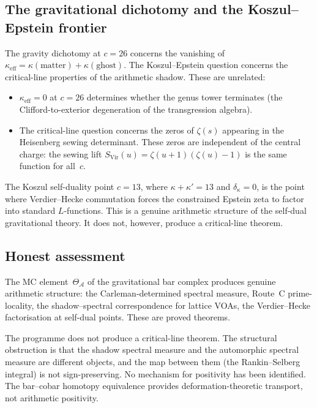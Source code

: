 \documentclass[11pt]{article}
\newcommand{\cA}{\mathcal{A}}
\begin{document}
\subsection{The gravitational dichotomy and the Koszul--Epstein frontier}

The gravity dichotomy at $c = 26$ concerns the vanishing of
$\kappa_{\mathrm{eff}} = \kappa(\mathrm{matter})
+ \kappa(\mathrm{ghost})$.  The Koszul--Epstein question
concerns the critical-line properties of the arithmetic
shadow.  These are unrelated:

\begin{itemize}
\item $\kappa_{\mathrm{eff}} = 0$ at $c = 26$ determines whether
  the genus tower terminates (the Clifford-to-exterior
  degeneration of the transgression algebra).

\item The critical-line question concerns the zeros of
  $\zeta(s)$ appearing in the Heisenberg sewing determinant.
  These zeros are independent of the central charge: the sewing
  lift $S_{\mathrm{Vir}}(u) = \zeta(u+1)(\zeta(u) - 1)$ is the
  same function for all~$c$.
\end{itemize}

The Koszul self-duality point $c = 13$, where
$\kappa + \kappa' = 13$ and $\delta_\kappa = 0$, is the point
where Verdier--Hecke commutation forces the constrained Epstein
zeta to factor into standard $L$-functions.  This is a genuine
arithmetic structure of the self-dual gravitational theory.
It does not, however, produce a critical-line theorem.

\subsection{Honest assessment}

The MC element~$\Theta_\cA$ of the gravitational bar complex
produces genuine arithmetic structure: the Carleman-determined
spectral measure, Route~C prime-locality, the shadow--spectral
correspondence for lattice VOAs, the Verdier--Hecke factorisation
at self-dual points.  These are proved theorems.

The programme does not produce a critical-line theorem.  The
structural obstruction is that the shadow spectral measure
and the automorphic spectral measure are different objects, and
the map between them (the Rankin--Selberg integral) is not
sign-preserving.  No mechanism for positivity has been
identified.  The bar--cobar homotopy equivalence provides
deformation-theoretic transport, not arithmetic positivity.
\end{document}
